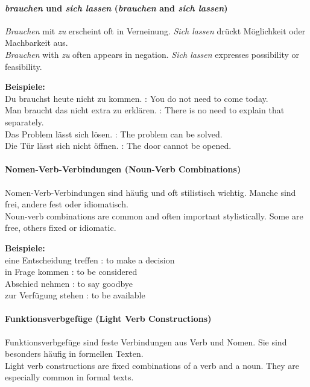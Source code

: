 \documentclass[a4paper]{article}
\begin{document}
    \paragraph{\textit{brauchen} und \textit{sich lassen} {\small (\textit{brauchen} and \textit{sich lassen})}}
        \textit{Brauchen} mit \textit{zu} erscheint oft in Verneinung. \textit{Sich lassen} drückt Möglichkeit oder Machbarkeit aus.\\
        \textit{Brauchen} with \textit{zu} often appears in negation. \textit{Sich lassen} expresses possibility or feasibility.
        
        \textbf{Beispiele:}\\
        Du brauchst heute nicht zu kommen. : You do not need to come today.\\
        Man braucht das nicht extra zu erklären. : There is no need to explain that separately.\\
        Das Problem lässt sich lösen. : The problem can be solved.\\
        Die Tür lässt sich nicht öffnen. : The door cannot be opened.
    
    \paragraph{Nomen-Verb-Verbindungen {\small (Noun-Verb Combinations)}}
        Nomen-Verb-Verbindungen sind häufig und oft stilistisch wichtig. Manche sind frei, andere fest oder idiomatisch.\\
        Noun-verb combinations are common and often important stylistically. Some are free, others fixed or idiomatic.
        
        \textbf{Beispiele:}\\
        eine Entscheidung treffen : to make a decision\\
        in Frage kommen : to be considered\\
        Abschied nehmen : to say goodbye\\
        zur Verfügung stehen : to be available
    
    \paragraph{Funktionsverbgefüge {\small (Light Verb Constructions)}}
        Funktionsverbgefüge sind feste Verbindungen aus Verb und Nomen. Sie sind besonders häufig in formellen Texten.\\
        Light verb constructions are fixed combinations of a verb and a noun. They are especially common in formal texts.
        
\end{document}
